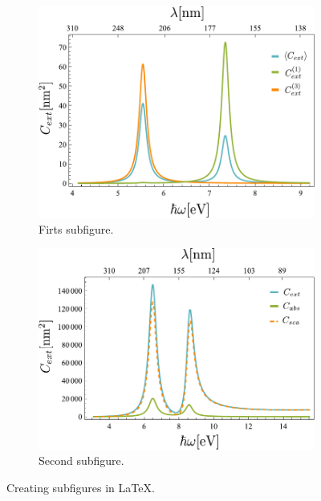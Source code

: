 \begin{figure}
	\centering
	\begin{subfigure}{0.47\textwidth}
		\includegraphics[width=\textwidth]{../../Figuras/CextAlbueno}
		\caption{Firts subfigure.}
		\label{fig:first}
	\end{subfigure}
	\hfill
	\begin{subfigure}{0.5\textwidth}
		\includegraphics[width=\textwidth]{../../Figuras/AlContribuciones3}
		\caption{Second subfigure.}
		\label{fig:second}
	\end{subfigure}
	
	\caption{Creating subfigures in \LaTeX.}
	\label{fig:figures}
\end{figure}

